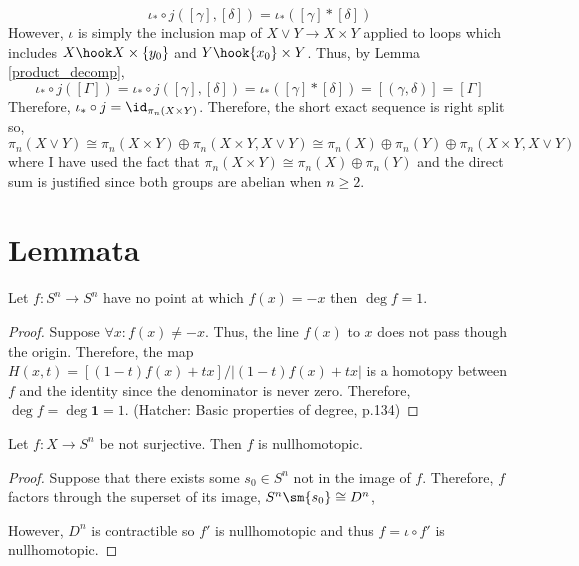 \documentclass[12pt]{extarticle}
\begin{document}
\[ \iota_* \circ j ([\gamma], [\delta]) = \iota_*([\gamma] * [\delta])  \]
However, $\iota$ is simply the inclusion map of $X \vee Y \to X \times Y$ applied to loops which includes $X \hook X \times \{y_0\}$ and $Y \hook \{x_0\} \times Y$. Thus, by Lemma \ref{product_decomp},
\[ \iota_* \circ j([\Gamma]) = \iota_* \circ j ([\gamma], [\delta]) = \iota_*([\gamma] * [\delta]) = [(\gamma, \delta)] = [\Gamma] \]
Therefore, $\iota_* \circ j = \id_{\pi_n(X \times Y)}$. Therefore, the short exact sequence is right split so,
\[ \pi_n(X \vee Y) \cong \pi_n(X \times Y) \oplus \pi_n(X \times Y, X \vee Y) \cong \pi_n(X) \oplus \pi_n(Y) \oplus \pi_n(X \times Y, X \vee Y) \]
where I have used the fact that $\pi_n(X \times Y) \cong \pi_n(X) \oplus \pi_n(Y)$ and the direct sum is justified since both groups are abelian when $n \ge 2$.  

\section{Lemmata}

\begin{lemma} \label{antifixed}
Let $f : S^n \to S^n$ have no point at which $f(x) = - x$ then $\deg{f} = 1$. 
\end{lemma}


\begin{proof}
Suppose $\forall x : f(x) \neq -x$. Thus, the line $f(x)$ to $x$ does not pass though the origin. Therefore, the map $H(x, t) = [(1 - t) f(x) + t x] / | (1 - t) f(x) + t x |$ is a homotopy between $f$ and the identity since the denominator is never zero. Therefore, $\deg{f} = \deg{\mathbf{1}} = 1$. (Hatcher: Basic properties of degree, p.134)
\end{proof}

\begin{lemma} \label{not-surjective-sphere}
Let $f : X \to S^n$ be not surjective. Then $f$ is nullhomotopic.
\end{lemma}

\begin{proof}
Suppose that there exists some $s_0 \in S^n$ not in the image of $f$. Therefore, $f$ factors through the superset of its image, $S^n \sm \{s_0\} \cong D^n$,
\begin{center}
\end{center}
However, $D^n$ is contractible so $f'$ is nullhomotopic and thus $f = \iota \circ f'$ is nullhomotopic. 
\end{proof}
\end{document}

